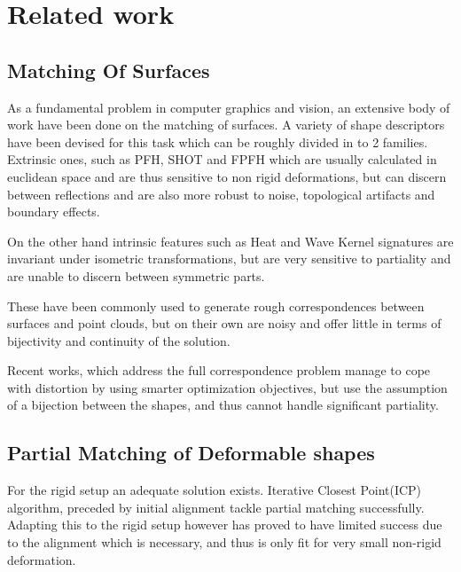 \documentclass[10pt,twocolumn,letterpaper]{article}
\begin{document}
\section{Related work}\label{chap:related work}


\subsection{Matching Of Surfaces}
As a fundamental problem in computer graphics and vision, an extensive body of work have been done on the matching of surfaces.
A variety of shape descriptors have been devised for this task which can be roughly divided in to 2 families. 
Extrinsic ones, such as PFH\cite{rusu2008learning}, SHOT\cite{tombari2010unique} and FPFH\cite{rusu2009fast} which are usually calculated in euclidean space and are thus sensitive to non rigid deformations, but can discern between reflections and are also more robust to noise, topological artifacts and boundary effects.
 
On the other hand intrinsic features such as Heat\cite{bronstein2010scale} and Wave Kernel signatures\cite{aubry2011wave} are invariant under isometric transformations, but are very sensitive to partiality and are unable to discern between symmetric parts.

These have been commonly used to generate rough correspondences between surfaces and point clouds, but on their own are noisy and offer little in terms of bijectivity and continuity of the solution.

 Recent works, which address the full correspondence problem\cite{aigerman2015seamless,maron2016point,solomon2016entropic,vestner2017product} manage to cope with distortion by using smarter optimization objectives, but use the assumption of a bijection between the shapes, and thus cannot handle significant partiality.
\subsection{Partial Matching of Deformable shapes}

For the rigid setup an adequate solution exists. Iterative Closest Point(ICP)\cite{Aiger:2008:CSR:1360612.1360684} algorithm, preceded by initial alignment\cite{rusu2008towards} tackle partial matching successfully. Adapting this to the rigid setup however has proved to have limited success due to the alignment which is necessary, and thus is only fit for very small non-rigid deformation.
\end{document}
